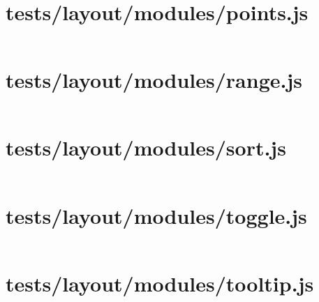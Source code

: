 \documentclass[a4paper]{article}
\begin{document}
\section{tests/layout/modules/points.js}
\inputminted[linenos,breaklines,breakbytoken]{javascript}{tests/layout/modules/points.js}

\section{tests/layout/modules/range.js}
\inputminted[linenos,breaklines,breakbytoken]{javascript}{tests/layout/modules/range.js}

\section{tests/layout/modules/sort.js}
\inputminted[linenos,breaklines,breakbytoken]{javascript}{tests/layout/modules/sort.js}

\section{tests/layout/modules/toggle.js}
\inputminted[linenos,breaklines,breakbytoken]{javascript}{tests/layout/modules/toggle.js}

\section{tests/layout/modules/tooltip.js}
\inputminted[linenos,breaklines,breakbytoken]{javascript}{tests/layout/modules/tooltip.js}
\end{document}
